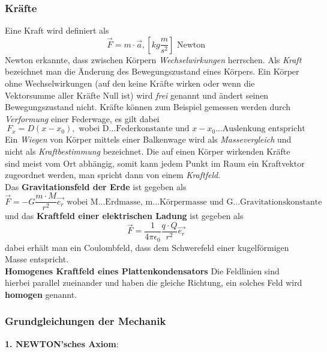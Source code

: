 \documentclass[12pt,a4paper,ngerman]{article}
\begin{document}
\subsubsection*{Kräfte}
Eine Kraft wird definiert als
\begin{equation}
\vec{F} = m \cdot \vec{a}, [kg\frac{m}{s^2}] \text{ Newton}
\end{equation}
Newton erkannte, dass zwischen Körpern \textit{Wechselwirkungen} herrschen. Als \textit{Kraft} bezeichnet man die Änderung des Bewegungszustand eines Körpers. Ein Körper ohne Wechselwirkungen (auf den keine Kräfte wirken oder wenn die Vektorsumme aller Kräfte Null ist) wird \textit{frei} genannt und ändert seinen Bewegungszustand nicht.
Kräfte können zum Beispiel gemessen werden durch \textit{Verformung} einer Federwage, es gilt dabei
\begin{equation}
F_x = D(x-x_0), \text{ wobei D...Federkonstante und } x-x_0 \text{...Auslenkung entspricht}
\end{equation}
Ein \textit{Wiegen} von Körper mittels einer Balkenwage wird als \textit{Massevergleich} und nicht als \textit{Kraftbestimmung}
bezeichnet.
Die auf einen Körper wirkenden Kräfte sind meist vom Ort abhängig, somit kann jedem Punkt im Raum ein Kraftvektor zugeordnet werden, man spricht dann von einem \textit{Kraftfeld}. \\
Das \textbf{Gravitationsfeld der Erde} ist gegeben als
\begin{equation}
\vec{F} = -G \frac{m \cdot M}{r^2}\vec{e_r} \text{ wobei M...Erdmasse, m...Körpermasse und G...Gravitationskonstante}
\end{equation}
und das \textbf{Kraftfeld einer elektrischen Ladung} ist gegeben als
\begin{equation}
\vec{F} = \frac{1}{4 \pi \epsilon_0}\frac{q \cdot Q}{r^2}\vec{e_r}
\end{equation}
dabei erhält man ein Coulombfeld, dass dem Schwerefeld einer kugelförmigen Masse entspricht. \vspace{0.5cm}\\
\textbf{Homogenes Kraftfeld eines Plattenkondensators} Die Feldlinien sind hierbei parallel zueinander und haben die gleiche Richtung, ein solches Feld wird \textbf{homogen} genannt. 

\subsubsection*{Grundgleichungen der Mechanik}

\textbf{1. NEWTON'sches Axiom}:
\end{document}
